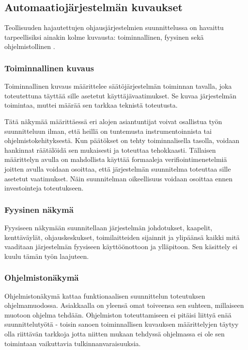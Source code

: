 \documentclass[finnish,12pt]{article}
\begin{document}
	\subsection{Automaatiojärjestelmän kuvaukset}

Teollisuuden hajautettujen ohjausjärjestelmien suunnittelussa on havaittu
tarpeellisiksi ainakin kolme kuvausta: toiminnallinen, fyysinen sekä ohjelmistollinen \cite{RefWorks:38}.

		\subsubsection{Toiminnallinen kuvaus}

Toiminnallinen kuvaus määrittelee säätöjärjestelmän toiminnan tavalla, joka toteutettuna täyttää sille asetetut käyttäjävaatimukset.
Se kuvaa järjestelmän toimintaa, muttei määrää sen tarkkaa teknistä toteutusta. \cite{RefWorks:60}

Tätä näkymää määrittäessä eri alojen asiantuntijat voivat osallistua työn suunnitteluun ilman, että heillä on tuntemusta instrumentoinnista tai ohjelmistokehityksestä.
Kun päätökset on tehty toiminnalisella tasolla, voidaan hankinnat räätälöidä sen mukaisesti ja toteuttaa tehokkaasti.
Tällaisen määrittelyn avulla on mahdollista käyttää formaaleja verifiointimenetelmiä joitten avulla
voidaan osoittaa, että järjestelmän suunnitelma toteuttaa sille asetetut vaatimukset.
Näin suunnitelman oikeellisuus voidaan osoittaa ennen investointeja toteutukseen. \cite{RefWorks:41}

		\subsubsection{Fyysinen näkymä}

Fyysiseen näkymään suunnitellaan järjestelmän johdotukset, kaapelit, kenttäväylät,
ohjauskeskukset, toimilaitteiden sijainnit ja ylipäänsä kaikki mitä vaaditaan 
järjestelmän fyysiseen käyttöönottoon ja ylläpitoon. Sen käsittely ei kuulu tämän työn laajuteen.

		\subsubsection{Ohjelmistonäkymä}

Ohjelmistonäkymä kattaa funktionaalisen suunnittelun toteutuksen ohjelmamuodossa.
Asiakkaalla on yleensä omat toiveensa sen suhteen, millaiseen muotoon ohjelma tehdään.
Ohjelmiston toteuttamiseen ei pitäisi liittyä enää suunnittelutyötä - toisin sanoen toiminnallisen kuvauksen määrittelyjen täytyy olla riittävän tarkkoja jotta niitten mukaan tehdyssä ohjelmassa ei ole sen toimintaan vaikuttavia tulkinnanvaraisuuksia.
\end{document}
